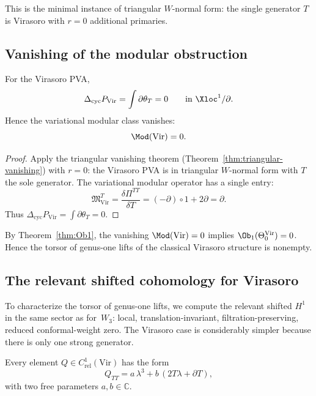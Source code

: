 This is the minimal instance of triangular $W$-normal form: the single
generator $T$ is Virasoro with $r=0$ additional primaries.

\subsection{Vanishing of the modular obstruction}
\label{subsec:virasoro-mod-vanishing}

\begin{proposition}
\label{prop:virasoro-mod-vanishing}
For the Virasoro PVA,
\[
\Delta_{\mathrm{cyc}} P_{\mathrm{Vir}} = \int \partial\theta_T = 0
\qquad\text{in }\Xloc^1/\partial.
\]
Hence the variational modular class vanishes:
\[
\Mod(\mathrm{Vir}) = 0.
\]
\end{proposition}

\begin{proof}
Apply the triangular vanishing theorem (Theorem~\ref{thm:triangular-vanishing})
with $r=0$: the Virasoro PVA is in triangular $W$-normal form with $T$ the
sole generator. The variational modular operator has a single entry:
\[
\mathfrak{M}_{\mathrm{Vir}}^T
= \frac{\delta\Pi^{TT}}{\delta T}
= (-\partial)\circ 1 + 2\partial = \partial.
\]
Thus $\Delta_{\mathrm{cyc}}P_{\mathrm{Vir}} = \int\partial\theta_T = 0$.
\end{proof}

\begin{corollary}
\label{cor:virasoro-genus1-nonempty}
By Theorem~\textup{\ref{thm:Ob1}}, the vanishing
$\Mod(\mathrm{Vir})=0$ implies
$\Ob_1(\Theta_0^{\mathrm{Vir}})=0$. Hence the torsor of genus-one lifts
of the classical Virasoro structure is nonempty.
\end{corollary}

\subsection{The relevant shifted cohomology for Virasoro}
\label{subsec:virasoro-relevant-H1}

To characterize the torsor of genus-one lifts, we compute the relevant shifted
$H^1$ in the same sector as for~$W_3$: local, translation-invariant,
filtration-preserving, reduced conformal-weight zero. The Virasoro case is
considerably simpler because there is only one strong generator.

\begin{proposition}
\label{prop:virasoro-relevant-normal-form}
Every element $Q\in C^1_{\mathrm{rel}}(\mathrm{Vir})$ has the form
\[
Q_{TT} = a\,\lambda^3 + b\,(2T\lambda + \partial T),
\]
with two free parameters $a,b\in\mathbb C$.
\end{proposition}

